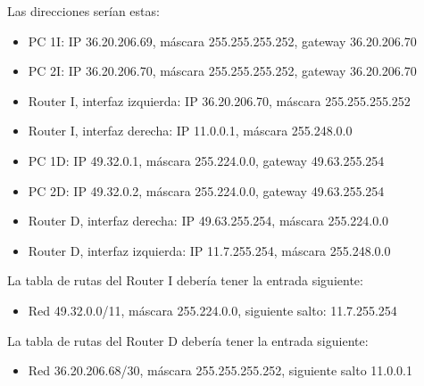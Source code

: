 \documentclass[letterpaper,10pt,spanish]{sphinxmanual}
\begin{document}
\sphinxAtStartPar
Las direcciones serían estas:
\begin{itemize}
\item {} 
\sphinxAtStartPar
PC 1I: IP 36.20.206.69, máscara 255.255.255.252, gateway 36.20.206.70

\item {} 
\sphinxAtStartPar
PC 2I: IP 36.20.206.70, máscara 255.255.255.252, gateway 36.20.206.70

\item {} 
\sphinxAtStartPar
Router I, interfaz izquierda: IP 36.20.206.70, máscara 255.255.255.252

\item {} 
\sphinxAtStartPar
Router I, interfaz derecha: IP 11.0.0.1, máscara 255.248.0.0

\item {} 
\sphinxAtStartPar
PC 1D: IP 49.32.0.1, máscara 255.224.0.0, gateway 49.63.255.254

\item {} 
\sphinxAtStartPar
PC 2D: IP 49.32.0.2, máscara 255.224.0.0, gateway 49.63.255.254

\item {} 
\sphinxAtStartPar
Router D, interfaz derecha: IP 49.63.255.254, máscara 255.224.0.0

\item {} 
\sphinxAtStartPar
Router D, interfaz izquierda: IP 11.7.255.254, máscara 255.248.0.0

\end{itemize}

\sphinxAtStartPar
La tabla de rutas del Router I debería tener la entrada siguiente:
\begin{itemize}
\item {} 
\sphinxAtStartPar
Red 49.32.0.0/11, máscara 255.224.0.0, siguiente salto: 11.7.255.254

\end{itemize}

\sphinxAtStartPar
La tabla de rutas del Router D debería tener la entrada siguiente:
\begin{itemize}
\item {} 
\sphinxAtStartPar
Red 36.20.206.68/30, máscara 255.255.255.252, siguiente salto 11.0.0.1

\end{itemize}
\end{document}

